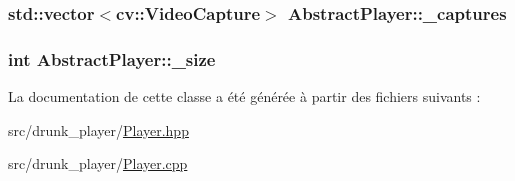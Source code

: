 \subsubsection[{\texorpdfstring{\+\_\+captures}{_captures}}]{\setlength{\rightskip}{0pt plus 5cm}std\+::vector$<$cv\+::\+Video\+Capture$>$ Abstract\+Player\+::\+\_\+captures\hspace{0.3cm}{\ttfamily [protected]}}\hypertarget{classAbstractPlayer_a72dd2ef25310decd45671a7d51e1f319}{}\label{classAbstractPlayer_a72dd2ef25310decd45671a7d51e1f319}
\subsubsection[{\texorpdfstring{\+\_\+size}{_size}}]{\setlength{\rightskip}{0pt plus 5cm}int Abstract\+Player\+::\+\_\+size\hspace{0.3cm}{\ttfamily [protected]}}\hypertarget{classAbstractPlayer_a9d8395a141cc985622d4910209bc7d53}{}\label{classAbstractPlayer_a9d8395a141cc985622d4910209bc7d53}


La documentation de cette classe a été générée à partir des fichiers suivants \+:\begin{DoxyCompactItemize}
\item 
src/drunk\+\_\+player/\hyperlink{Player_8hpp}{Player.\+hpp}\item 
src/drunk\+\_\+player/\hyperlink{Player_8cpp}{Player.\+cpp}\end{DoxyCompactItemize}
